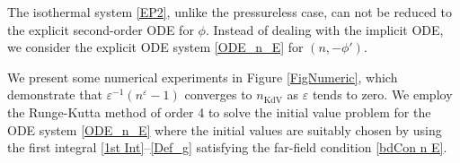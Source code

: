 \documentclass{amsart}
\newcommand{\veps}{\varepsilon}
\numberwithin{equation}{section}
\theoremstyle{plain}%
\theoremstyle{definition}
\theoremstyle{remark}
\theoremstyle{remark}
\begin{document}
The isothermal system \eqref{EP2}, unlike the pressureless case, can not be reduced to the explicit second-order ODE for $\phi$. Instead of dealing with the implicit ODE, we consider the explicit ODE system \eqref{ODE_n_E} for $(n,-\phi')$.

We  present some numerical experiments in Figure \ref{FigNumeric}, which demonstrate that $\veps^{-1}(n^\veps-1)$ converges to $n_{\text{KdV}}$ as $\veps$ tends to zero. 
%
We employ the Runge-Kutta method of order 4 to solve the initial value problem for the ODE system \eqref{ODE_n_E} where the  initial values are suitably chosen by using the first integral \eqref{1st Int}--\eqref{Def_g} satisfying the far-field condition \eqref{bdCon n E}.
\end{document}
